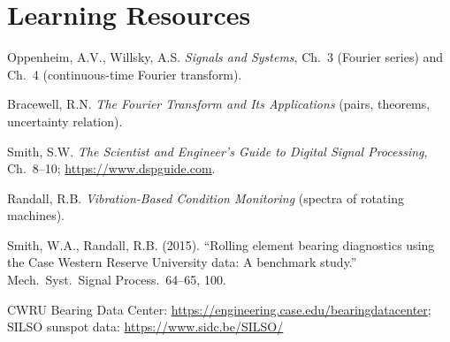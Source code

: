 \documentclass[11pt,a4paper]{article}
\begin{document}
\section*{Learning Resources}
\begin{resources}
  \item Oppenheim, A.V., Willsky, A.S. \emph{Signals and Systems}, Ch.~3 (Fourier series) and Ch.~4 (continuous-time Fourier transform).
  \item Bracewell, R.N. \emph{The Fourier Transform and Its Applications} (pairs, theorems, uncertainty relation).
  \item Smith, S.W. \emph{The Scientist and Engineer's Guide to Digital Signal Processing}, Ch.~8--10; \url{https://www.dspguide.com}.
\end{resources}
\begin{resources}
  \item Randall, R.B. \emph{Vibration-Based Condition Monitoring} (spectra of rotating machines).
  \item Smith, W.A., Randall, R.B. (2015). ``Rolling element bearing diagnostics using the Case Western Reserve University data: A benchmark study.'' Mech.\ Syst.\ Signal Process.\ 64--65, 100.
  \item CWRU Bearing Data Center: \url{https://engineering.case.edu/bearingdatacenter}; SILSO sunspot data: \url{https://www.sidc.be/SILSO/}
\end{resources}

\evaluation
\end{document}
